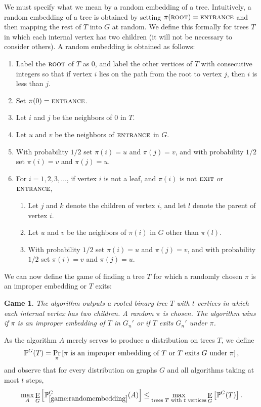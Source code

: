 \documentclass[aps,11pt,twoside,nofootinbib,tightenlines,superscriptaddress,preprintnumbers]{revtex4}
\newcommand{\<}{\langle}
\renewcommand{\>}{\rangle}
\newcommand{\be}{\begin{equation}}
\newcommand{\ee}{\end{equation}}
\newcommand{\ent}{{\textsc{entrance}}}
\newcommand{\exit}{{\textsc{exit}}}
\renewcommand{\root}{{\textsc{root}}}
\newcommand\symProb{\mathop{\mathrm{Pr}}\displaylimits}
\newcommand\symExpec{\mathop{\mathrm{E}}\displaylimits}
\def\prob#1#2{\symProb_{#1}\left[ #2 \right]}
\def\expec#1#2{\symExpec_{#1}\left[ #2 \right]}
\newtheorem{game}{Game}
\begin{document}
We must specify what we mean by a random embedding of a tree.
Intuitively, a random embedding of a tree is obtained by setting
$\pi(\root) = \ent$ and then mapping the rest of $T$ into $G$ at random.
We define this formally for trees $T$ in which each internal vertex has
two children (it will not be necessary to consider others).  A random
embedding is obtained as follows:
\begin{enumerate}
\item Label the $\root$ of $T$ as 0, and label the other vertices of $T$
      with consecutive integers so that if vertex $i$ lies on the path
      from the root to vertex $j$, then $i$ is less than $j$.
\item Set $\pi (0) = \ent$.
\item Let $i$ and $j$ be the neighbors of $0$ in $T$.
\item Let $u$ and $v$ be the neighbors of $\ent$ in $G$.
\item With probability $1/2$ set $\pi (i) =u$ and $\pi (j) = v$, and
      with probability $1/2$ set $\pi (i) =v$ and $\pi (j) = u$.
\item For $i = 1, 2, 3, \ldots$, if vertex $i$ is not a leaf, and $\pi(i)$
      is not $\exit$ or $\ent$,
      \begin{enumerate}
	  \item Let $j$ and $k$ denote the children of vertex $i$, and let
                $l$ denote the parent of vertex $i$.
	  \item Let $u$ and $v$ be the neighbors of $\pi(i)$ in $G$ other
	        than $\pi(l)$.
	  \item With probability $1/2$ set $\pi(i)=u$ and $\pi(j)=v$, and
	        with probability $1/2$ set $\pi(i)=v$ and $\pi(j)=u$.
      \end{enumerate}
\end{enumerate}

We can now define the game of finding a tree $T$ for which a randomly
chosen $\pi$ is an improper embedding or $T$ exits:

\begin{game}\label{game:randomembedding}
  The algorithm outputs a rooted binary tree $T$ with $t$ vertices in
  which each internal vertex has two children.  A random $\pi$ is chosen.
  The algorithm wins if $\pi$ is an improper embedding of $T$ in $G_n'$ or
  if $T$ exits $G_n'$ under $\pi$.
\end{game}

\noindent
As the algorithm $A$ merely serves to produce a distribution on trees $T$,
we define
\be
  \mathbb{P}^G(T) =
  \prob{\pi}
       {\mbox{$\pi$ is an improper embedding of $T$ or $T$ exits $G$
        under $\pi$}},
\ee
and observe that for every distribution on graphs $G$ and all algorithms
taking at most $t$ steps,
\be
\max_{A} \expec{G}{\mathbb{P}^{G}_{\ref{game:randomembedding}}(A)}
   \leq  \max_{\mbox{\scriptsize trees $T$ with $t$ vertices}}
   \expec{G}{\mathbb{P}^{G} (T)}.
\ee
\end{document}
